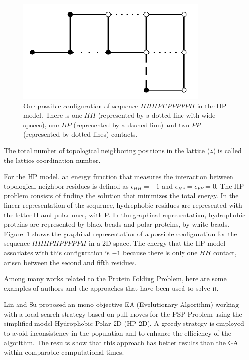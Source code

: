 \begin{figure}[htb!] \label{fig:PROTEXAM}
	\centering
	\includegraphics[scale=0.7]{figures/protein_example.png}
	\caption{One possible configuration of  sequence $HHHPHPPPPPH$ in the HP model. There is one $HH$ (represented by a dotted line with wide spaces), one $HP$ (represented by a dashed line) and  two $PP$  (represented by dotted lines) contacts.}
\end{figure}


The total number of topological neighboring positions in the lattice ($z$) is called the lattice coordination number.


For the HP model, an energy function that  measures the interaction between topological  neighbor residues is defined  as  $\epsilon_{HH}=-1$ and $\epsilon_{HP}=\epsilon_{PP}=0$. The HP problem consists of finding the solution that minimizes the total energy. In the linear representation of the sequence, hydrophobic residues are represented with the letter H and polar ones, with P. In the graphical representation, hydrophobic proteins are represented  by black beads and polar proteins, by white beads. Figure~\ref{fig:PROTEXAM} shows the graphical representation of a possible configuration for  the sequence  $HHHPHPPPPPH$ in a 2D space. The energy that the HP model associates with this configuration is $-1$ because there is only one $HH$ contact, arisen between the second and fifth residues.


Among many works related to the Protein Folding Problem, here are some examples of authors and the approaches that have been used to solve it.


Lin and Su \cite{li2012genetic} proposed an mono objective EA (Evolutionary Algorithm) working with a local search strategy based on pull-moves for the PSP Problem using the simplified model Hydrophobic-Polar 2D (HP-2D). A greedy strategy is employed to avoid inconsistency in the population and to enhance the efficiency of the algorithm. The results show that this approach has better results than the GA within comparable computational times.


